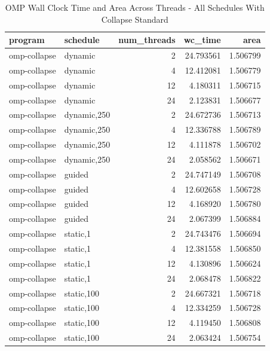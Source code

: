 \documentclass{article}
\begin{document}
\begin{table}[H]
    \centering
    \caption{OMP Wall Clock Time and Area Across Threads - All Schedules With Collapse Standard}
    \centering
    \fontsize{12}{14}\selectfont
    \begin{tabular}[t]{l|l|r|r|r}
    \hline
    program & schedule & num\_threads & wc\_time & area\\
    \hline
    omp-collapse & dynamic & 2 & 24.793561 & 1.506799\\
    \hline
    omp-collapse & dynamic & 4 & 12.412081 & 1.506779\\
    \hline
    omp-collapse & dynamic & 12 & 4.180311 & 1.506715\\
    \hline
    omp-collapse & dynamic & 24 & 2.123831 & 1.506677\\
    \hline
    omp-collapse & dynamic,250 & 2 & 24.672736 & 1.506713\\
    \hline
    omp-collapse & dynamic,250 & 4 & 12.336788 & 1.506789\\
    \hline
    omp-collapse & dynamic,250 & 12 & 4.111878 & 1.506702\\
    \hline
    omp-collapse & dynamic,250 & 24 & 2.058562 & 1.506671\\
    \hline
    omp-collapse & guided & 2 & 24.747149 & 1.506708\\
    \hline
    omp-collapse & guided & 4 & 12.602658 & 1.506728\\
    \hline
    omp-collapse & guided & 12 & 4.168920 & 1.506780\\
    \hline
    omp-collapse & guided & 24 & 2.067399 & 1.506884\\
    \hline
    omp-collapse & static,1 & 2 & 24.743476 & 1.506694\\
    \hline
    omp-collapse & static,1 & 4 & 12.381558 & 1.506850\\
    \hline
    omp-collapse & static,1 & 12 & 4.130896 & 1.506624\\
    \hline
    omp-collapse & static,1 & 24 & 2.068478 & 1.506822\\
    \hline
    omp-collapse & static,100 & 2 & 24.667321 & 1.506718\\
    \hline
    omp-collapse & static,100 & 4 & 12.334259 & 1.506728\\
    \hline
    omp-collapse & static,100 & 12 & 4.119450 & 1.506808\\
    \hline
    omp-collapse & static,100 & 24 & 2.063424 & 1.506754\\
    \hline
    \end{tabular}
\end{table}
\end{document}
